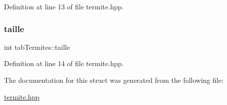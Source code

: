 Definition at line 13 of file termite.\+hpp.

\mbox{\label{structtabTermites_a0fe7fc43b7bac06c6fc7c85dd8022126}} 
\subsubsection{\texorpdfstring{taille}{taille}}
{\footnotesize\ttfamily int tab\+Termites\+::taille}



Definition at line 14 of file termite.\+hpp.



The documentation for this struct was generated from the following file\+:\begin{DoxyCompactItemize}
\item 
\hyperlink{termite_8hpp}{termite.\+hpp}\end{DoxyCompactItemize}
